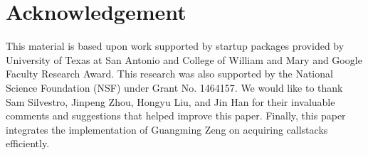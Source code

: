 \section{Acknowledgement}

This material is based upon work supported by %
startup packages provided by University of Texas at San Antonio and College of William and Mary and Google Faculty Research Award. This research was also supported by the National Science Foundation (NSF) under Grant No. 1464157. We would like to thank Sam Silvestro, Jinpeng Zhou, Hongyu Liu, and Jin Han for their invaluable comments and suggestions that helped improve this paper. Finally, this paper integrates the implementation of Guangming Zeng on acquiring callstacks efficiently.